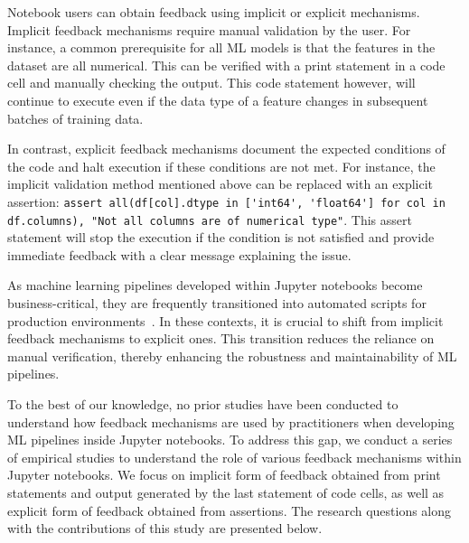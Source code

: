 Notebook users can obtain feedback using implicit or explicit mechanisms. Implicit feedback mechanisms require manual validation by the user. For instance, a common prerequisite for all ML models is that the features in the dataset are all numerical. This can be verified with a print statement in a code cell and manually checking the output. This code statement however, will continue to execute even if the data type of a feature changes in subsequent batches of training data.

In contrast, explicit feedback mechanisms document the expected conditions of the code and halt execution if these conditions are not met. For instance, the implicit validation method mentioned above can be replaced with an explicit assertion: \lstinline{assert all(df[col].dtype in ['int64', 'float64'] for col in df.columns), "Not all columns are of numerical type"}. This assert statement will stop the execution if the condition is not satisfied and provide immediate feedback with a clear message explaining the issue.

As machine learning pipelines developed within Jupyter notebooks become business-critical, they are frequently transitioned into automated scripts for production environments~\cite{kery2018story,rule2018exploration}. In these contexts, it is crucial to shift from implicit feedback mechanisms to explicit ones. This transition reduces the reliance on manual verification, thereby enhancing the robustness and maintainability of ML pipelines.

To the best of our knowledge, no prior studies have been conducted to understand how feedback mechanisms are used by practitioners when developing ML pipelines inside Jupyter notebooks. To address this gap, we conduct a series of empirical studies to understand the role of various feedback mechanisms within Jupyter notebooks. We focus on implicit form of feedback obtained from print statements and output generated by the last statement of code cells, as well as explicit form of feedback obtained from assertions. The research questions along with the contributions of this study are presented below.

